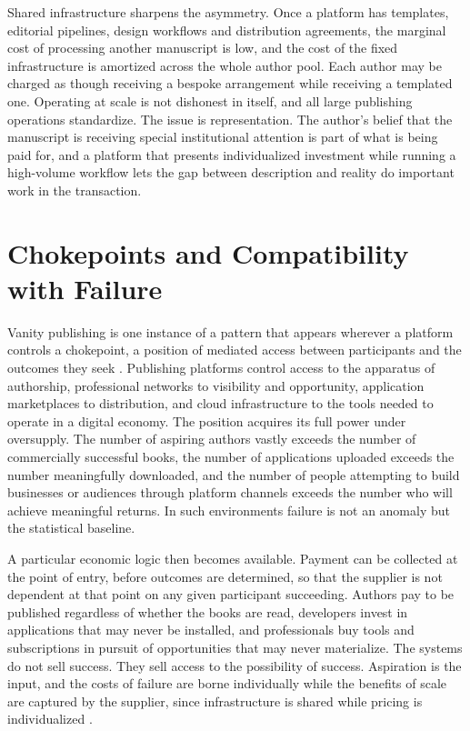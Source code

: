 \documentclass[12pt, a4paper]{article}
\begin{document}
Shared infrastructure sharpens the asymmetry. Once a platform has templates, editorial pipelines, design workflows and distribution agreements, the marginal cost of processing another manuscript is low, and the cost of the fixed infrastructure is amortized across the whole author pool. Each author may be charged as though receiving a bespoke arrangement while receiving a templated one. Operating at scale is not dishonest in itself, and all large publishing operations standardize. The issue is representation. The author's belief that the manuscript is receiving special institutional attention is part of what is being paid for, and a platform that presents individualized investment while running a high-volume workflow lets the gap between description and reality do important work in the transaction.

\section{Chokepoints and Compatibility with Failure}

Vanity publishing is one instance of a pattern that appears wherever a platform controls a chokepoint, a position of mediated access between participants and the outcomes they seek \citep{doctorow2022,srnicek2017}. Publishing platforms control access to the apparatus of authorship, professional networks to visibility and opportunity, application marketplaces to distribution, and cloud infrastructure to the tools needed to operate in a digital economy. The position acquires its full power under oversupply. The number of aspiring authors vastly exceeds the number of commercially successful books, the number of applications uploaded exceeds the number meaningfully downloaded, and the number of people attempting to build businesses or audiences through platform channels exceeds the number who will achieve meaningful returns. In such environments failure is not an anomaly but the statistical baseline.

A particular economic logic then becomes available. Payment can be collected at the point of entry, before outcomes are determined, so that the supplier is not dependent at that point on any given participant succeeding. Authors pay to be published regardless of whether the books are read, developers invest in applications that may never be installed, and professionals buy tools and subscriptions in pursuit of opportunities that may never materialize. The systems do not sell success. They sell access to the possibility of success. Aspiration is the input, and the costs of failure are borne individually while the benefits of scale are captured by the supplier, since infrastructure is shared while pricing is individualized \citep{eisenmann2006}.
\end{document}
